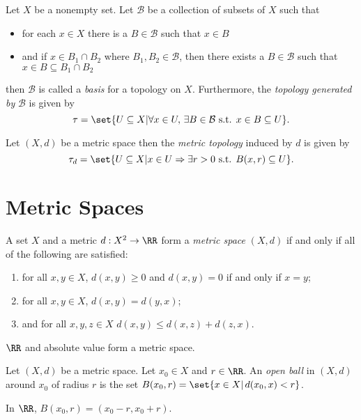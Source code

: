 \begin{definition*}
	Let $X$ be a nonempty set.
	Let $\mathcal{B}$ be a collection of subsets of $X$ such that
	\begin{itemize}
		\item for each $x\in X$ there is a $B\in\mathcal{B}$ such that $x\in B$
		\item and if $x\in B_1\cap B_2$ where $B_1,B_2\in\mathcal{B}$, then there exists a $B\in\mathcal{B}$ such that $x\in B\subseteq B_1\cap B_2$
	\end{itemize}
	then $\mathcal{B}$ is called a \textit{basis} for a topology on $X$.
	Furthermore, the \textit{topology generated by} $\mathcal{B}$ is given by
	\[
		\tau = \set{U\subseteq X|\forall x\in U,\,\exists B\in\mathcal{B} \text{ s.t. } x\in B\subseteq U}.
	\]
\end{definition*}
\begin{example*}
	Let $(X,d)$ be a metric space then the \textit{metric topology} induced by $d$ is given by
	\[
	\tau_d=\set{U\subseteq X| x\in U\Rightarrow \exists r>0\text{ s.t. } B(x,r)\subseteq U}.
	\]
\end{example*}


\pagebreak


\section*{Metric Spaces}


\begin{definition*}
	A set $X$ and a metric $d:X^2\rightarrow\RR$ form a \textit{metric space} $(X,d)$ if and only if all of the following are satisfied:
	\begin{enumerate}
		\item for all $x,y\in X$, $d(x,y)\geq 0$ and $d(x,y)=0$ if and only if $x=y$;
		\item for all $x,y\in X$, $d(x,y)=d(y,x)$;
		\item and for all $x,y,z\in X$ $d(x,y)\leq d(x,z)+d(z,x)$.
	\end{enumerate}
\end{definition*}
\begin{example*}
	$\RR$ and absolute value form a metric space.
\end{example*}

\begin{definition*}
	Let $(X,d)$ be a metric space.
	Let $x_0\in X$ and $r\in\RR$.
	An \textit{open ball} in $(X,d)$ around $x_0$ of radius $r$ is the set $B(x_0,r)=\set{x\in X|\, d(x_0,x)< r}$.
\end{definition*}
\begin{example*}
	In $\RR$, $B(x_0, r)=(x_0-r,x_0+r)$.
\end{example*}

